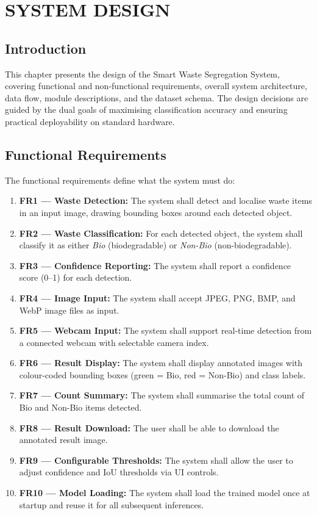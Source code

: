 \chapter{SYSTEM DESIGN}

\section{Introduction}

This chapter presents the design of the Smart Waste Segregation System, covering functional and non-functional requirements, overall system architecture, data flow, module descriptions, and the dataset schema. The design decisions are guided by the dual goals of maximising classification accuracy and ensuring practical deployability on standard hardware.

\section{Functional Requirements}

The functional requirements define what the system must do:

\begin{enumerate}
    \item \textbf{FR1 — Waste Detection:} The system shall detect and localise waste items in an input image, drawing bounding boxes around each detected object.
    \item \textbf{FR2 — Waste Classification:} For each detected object, the system shall classify it as either \textit{Bio} (biodegradable) or \textit{Non-Bio} (non-biodegradable).
    \item \textbf{FR3 — Confidence Reporting:} The system shall report a confidence score (0--1) for each detection.
    \item \textbf{FR4 — Image Input:} The system shall accept JPEG, PNG, BMP, and WebP image files as input.
    \item \textbf{FR5 — Webcam Input:} The system shall support real-time detection from a connected webcam with selectable camera index.
    \item \textbf{FR6 — Result Display:} The system shall display annotated images with colour-coded bounding boxes (green = Bio, red = Non-Bio) and class labels.
    \item \textbf{FR7 — Count Summary:} The system shall summarise the total count of Bio and Non-Bio items detected.
    \item \textbf{FR8 — Result Download:} The user shall be able to download the annotated result image.
    \item \textbf{FR9 — Configurable Thresholds:} The system shall allow the user to adjust confidence and IoU thresholds via UI controls.
    \item \textbf{FR10 — Model Loading:} The system shall load the trained model once at startup and reuse it for all subsequent inferences.
\end{enumerate}

